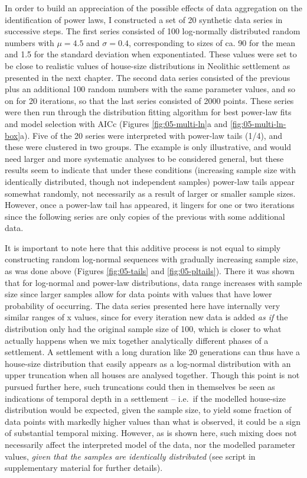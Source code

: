 \documentclass[
  12pt,
  a4paper, twoside]{book}
\begin{document}
In order to build an appreciation of the possible effects of data aggregation on the identification of power laws, I constructed a set of 20 synthetic data series in successive steps. The first series consisted of 100 log-normally distributed random numbers with \(\mu = 4.5\) and \(\sigma = 0.4\), corresponding to sizes of ca. 90 for the mean and 1.5 for the standard deviation when exponentiated. These values were set to be close to realistic values of house-size distributions in Neolithic settlement as presented in the next chapter. The second data series consisted of the previous plus an additional 100 random numbers with the same parameter values, and so on for 20 iterations, so that the last series consisted of 2000 points. These series were then run through the distribution fitting algorithm for best power-law fits and model selection with AICc (Figures \ref{fig:05-multi-ln}a and \ref{fig:05-multi-ln-box}a). Five of the 20 series were interpreted with power-law tails (1/4), and these were clustered in two groups. The example is only illustrative, and would need larger and more systematic analyses to be considered general, but these results seem to indicate that under these conditions (increasing sample size with identically distributed, though not independent samples) power-law tails appear somewhat randomly, not necessarily as a result of larger or smaller sample sizes. However, once a power-law tail has appeared, it lingers for one or two iterations since the following series are only copies of the previous with some additional data.

It is important to note here that this additive process is not equal to simply constructing random log-normal sequences with gradually increasing sample size, as was done above (Figures \ref{fig:05-tails} and \ref{fig:05-pltails}). There it was shown that for log-normal and power-law distributions, data range increases with sample size since larger samples allow for data points with values that have lower probability of occurring. The data series presented here have internally very similar ranges of x values, since for every iteration new data is added \emph{as if} the distribution only had the original sample size of 100, which is closer to what actually happens when we mix together analytically different phases of a settlement. A settlement with a long duration like 20 generations can thus have a house-size distribution that easily appears as a log-normal distribution with an upper truncation when all houses are analysed together. Though this point is not pursued further here, such truncations could then in themselves be seen as indications of temporal depth in a settlement -- i.e.~if the modelled house-size distribution would be expected, given the sample size, to yield some fraction of data points with markedly higher values than what is observed, it could be a sign of substantial temporal mixing. However, as is shown here, such mixing does not necessarily affect the interpreted model of the data, nor the modelled parameter values, \emph{given that the samples are identically distributed} (see script in supplementary material for further details).
\end{document}
